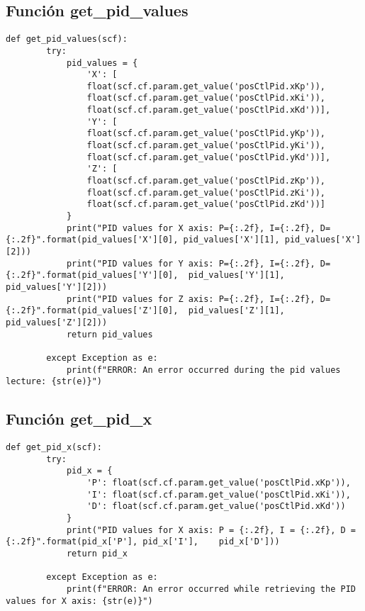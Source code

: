 \newpage
\subsection{Función get\_pid\_values}
\begin{lstlisting}[caption=Función en Python para obtener los valores de todos los PID de posición del Crazyflie., label=code:funcion_get_pid_values]
	def get_pid_values(scf):
		try:
			pid_values = {
				'X': [
				float(scf.cf.param.get_value('posCtlPid.xKp')),
				float(scf.cf.param.get_value('posCtlPid.xKi')),
				float(scf.cf.param.get_value('posCtlPid.xKd'))],
				'Y': [
				float(scf.cf.param.get_value('posCtlPid.yKp')),
				float(scf.cf.param.get_value('posCtlPid.yKi')),
				float(scf.cf.param.get_value('posCtlPid.yKd'))],
				'Z': [
				float(scf.cf.param.get_value('posCtlPid.zKp')),
				float(scf.cf.param.get_value('posCtlPid.zKi')),
				float(scf.cf.param.get_value('posCtlPid.zKd'))]
			}
			print("PID values for X axis: P={:.2f}, I={:.2f}, D={:.2f}".format(pid_values['X'][0], pid_values['X'][1], pid_values['X'][2]))
			print("PID values for Y axis: P={:.2f}, I={:.2f}, D={:.2f}".format(pid_values['Y'][0], 	pid_values['Y'][1], pid_values['Y'][2]))
			print("PID values for Z axis: P={:.2f}, I={:.2f}, D={:.2f}".format(pid_values['Z'][0], 	pid_values['Z'][1], pid_values['Z'][2]))
			return pid_values
		
		except Exception as e:
			print(f"ERROR: An error occurred during the pid values lecture: {str(e)}")
\end{lstlisting}

\subsection{Función get\_pid\_x}
\begin{lstlisting}[caption=Función en Python para obtener un PID de posición específico del Crazyflie., label=code:funcion_get_pid_x]
	def get_pid_x(scf):
		try:
			pid_x = {
				'P': float(scf.cf.param.get_value('posCtlPid.xKp')),
				'I': float(scf.cf.param.get_value('posCtlPid.xKi')),
				'D': float(scf.cf.param.get_value('posCtlPid.xKd'))
			}
			print("PID values for X axis: P = {:.2f}, I = {:.2f}, D = {:.2f}".format(pid_x['P'], pid_x['I'], 	pid_x['D']))
			return pid_x
		
		except Exception as e:
			print(f"ERROR: An error occurred while retrieving the PID values for X axis: {str(e)}")
\end{lstlisting}

\newpage
